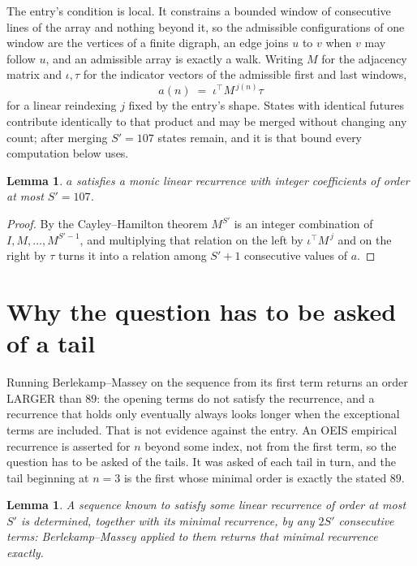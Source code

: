 \documentclass[11pt,a4paper]{article}
\theoremstyle{plain}
\newtheorem{lemma}[theorem]{Lemma}
\theoremstyle{definition}
\begin{document}
The entry's condition is local. It constrains a bounded window of consecutive lines of the
array and nothing beyond it, so the admissible configurations of one window are the vertices of
a finite digraph, an edge joins $u$ to $v$ when $v$ may follow $u$, and an admissible array is
exactly a walk. Writing $M$ for the adjacency matrix and $\iota,\tau$ for the indicator vectors
of the admissible first and last windows,
\[
a(n)\;=\;\iota^{\!\top}M^{\,j(n)}\tau
\]
for a linear reindexing $j$ fixed by the entry's shape. States with identical futures
contribute identically to that product and may be merged without changing any count; after
merging $S'=107$ states remain, and it is that bound every computation below uses.

\begin{lemma}\label{lem:cf}
$a$ satisfies a monic linear recurrence with integer coefficients of order at most $S'=107$.
\end{lemma}

\begin{proof}
By the Cayley--Hamilton theorem $M^{S'}$ is an integer combination of $I,M,\dots,M^{S'-1}$,
and multiplying that relation on the left by $\iota^{\!\top}M^{\,j}$ and on the right by
$\tau$ turns it into a relation among $S'+1$ consecutive values of $a$.
\end{proof}

\section{Why the question has to be asked of a tail}

Running Berlekamp--Massey on the sequence from its first term returns an order LARGER than $89$: the opening terms do not satisfy the recurrence, and a recurrence that holds only eventually always looks longer when the exceptional terms are included. That is not evidence against the entry. An OEIS empirical recurrence is asserted for $n$ beyond some index, not from the first term, so the question has to be asked of the tails. It was asked of each tail in turn, and the tail beginning at $n=3$ is the first whose minimal order is exactly the stated $89$.

\begin{lemma}\label{lem:bm}
A sequence known to satisfy some linear recurrence of order at most $S'$ is determined,
together with its minimal recurrence, by any $2S'$ consecutive terms: Berlekamp--Massey applied
to them returns that minimal recurrence exactly.
\end{lemma}
\end{document}
